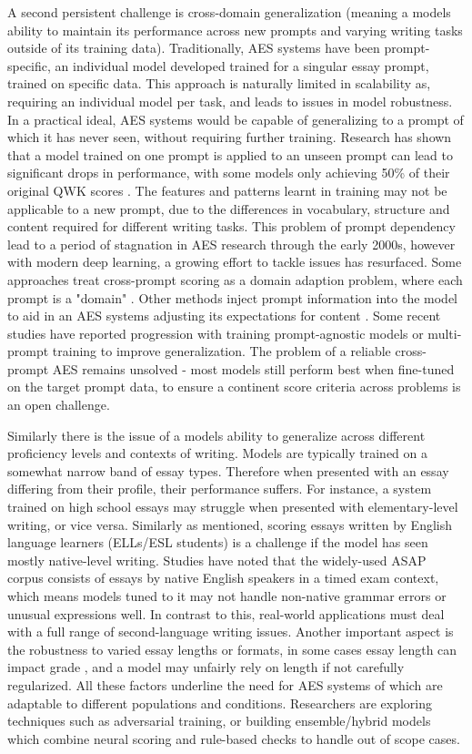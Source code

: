 \documentclass[12pt,a4paper]{report}
\begin{document}
A second persistent challenge is cross-domain generalization (meaning a models ability to maintain its performance across new prompts and varying writing tasks outside of its training data). Traditionally, AES systems have been prompt-specific, an individual model developed trained for a singular essay prompt, trained on specific data. This approach is naturally limited in scalability as, requiring an individual model per task, and leads to issues in model robustness. In a practical ideal, AES systems would be capable of generalizing to a prompt of which it has never seen, without requiring further training. Research has shown that a model trained on one prompt is applied to an unseen prompt can lead to significant drops in performance, with some models only achieving 50\% of their original QWK scores \citep{blanchard2013toefl}. The features and patterns learnt in training may not be applicable to a new prompt, due to the differences in vocabulary, structure and content required for different writing tasks. This problem of prompt dependency lead to a period of stagnation in AES research through the early 2000s, however with modern deep learning, a growing effort to tackle issues has resurfaced. Some approaches treat cross-prompt scoring as a domain adaption problem, where each prompt is a "domain" \citep{litman2024fairness}. Other methods inject prompt information into the model to aid in an AES systems adjusting its expectations for content \citep{blanchard2013toefl}. Some recent studies have reported progression with training prompt-agnostic models or multi-prompt training to improve generalization. The problem of a reliable cross-prompt AES remains unsolved - most models still perform best when fine-tuned on the target prompt data, to ensure a continent score criteria across problems is an open challenge. 

Similarly there is the issue of a models ability to generalize across different proficiency levels and contexts of writing. Models are typically trained on a somewhat narrow band of essay types. Therefore when presented with an essay differing from their profile, their performance suffers. For instance, a system trained on high school essays may struggle when presented with elementary-level writing, or vice versa.  Similarly as mentioned, scoring essays written by English language learners (ELLs/ESL students) is a challenge if the model has seen mostly native-level writing. Studies have noted that the widely-used ASAP corpus consists of essays by native English speakers in a timed exam context, which means models tuned to it may not handle non-native grammar errors or unusual expressions well. In contrast to this, real-world applications must deal with a full range of second-language writing issues. Another important aspect is the robustness to varied essay lengths or formats, in some cases essay length can impact grade \citep{Sgengjie2024acl}, and a model may unfairly rely on length if not carefully regularized. All these factors underline the need for AES systems of which are adaptable to different populations and conditions. Researchers are exploring techniques such as adversarial training, or building ensemble/hybrid models which combine neural scoring and rule-based checks to handle out of scope cases.
\end{document}

